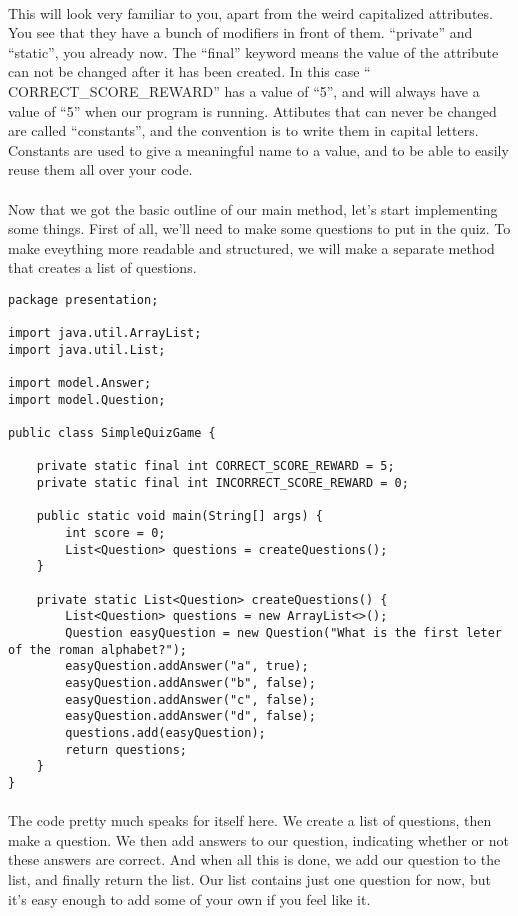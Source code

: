 \documentclass[11pt,fleqn]{book} %
\begin{document}
\paragraph{}This will look very familiar to you, apart from the weird capitalized attributes. You see that they have a bunch of modifiers in front of them. ``private'' and ``static'', you already now. The ``final'' keyword means the value of the attribute can not be changed after it has been created. In this case `` CORRECT_SCORE_REWARD'' has a value of ``5'', and will always have a value of ``5'' when our program is running. Attibutes that can never be changed are called ``constants'', and the convention is to write them in capital letters. Constants are used to give a meaningful name to a value, and to be able to easily reuse them all over your code. 

\paragraph{}Now that we got the basic outline of our main method, let's start implementing some things. First of all, we'll need to make some questions to put in the quiz.
To make eveything more readable and structured, we will make a separate method that creates a list of questions.

\begin{lstlisting}
package presentation;

import java.util.ArrayList;
import java.util.List;

import model.Answer;
import model.Question;

public class SimpleQuizGame {

	private static final int CORRECT_SCORE_REWARD = 5;
	private static final int INCORRECT_SCORE_REWARD = 0;
	
	public static void main(String[] args) {
		int score = 0;
		List<Question> questions = createQuestions();	
	}

	private static List<Question> createQuestions() {
		List<Question> questions = new ArrayList<>();
		Question easyQuestion = new Question("What is the first leter of the roman alphabet?");
		easyQuestion.addAnswer("a", true);
		easyQuestion.addAnswer("b", false);
		easyQuestion.addAnswer("c", false);
		easyQuestion.addAnswer("d", false);
		questions.add(easyQuestion);
		return questions;
	}
}
\end{lstlisting}
\paragraph{}The code pretty much speaks for itself here. We create a list of questions, then make a question. We then add answers to our question, indicating whether or not these answers are correct. And when all this is done, we add our question to the list, and finally return the list. Our list contains just one question for now, but it's easy enough to add some of your own if you feel like it.
\end{document}

